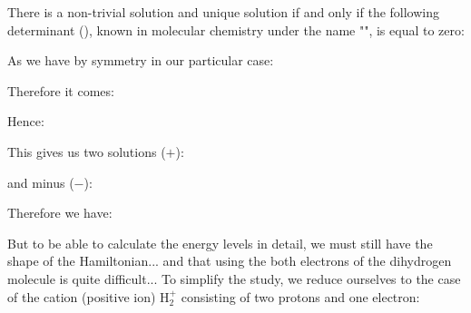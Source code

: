 	There is a non-trivial solution and unique solution if and only if the following determinant (), known in molecular chemistry under the name "", is equal to zero:
	
	As we have by symmetry in our particular case:
	
	Therefore it comes:
	
	Hence:
	
	This gives us two solutions ($+$):
	
	and minus ($-$):
	
	Therefore we have:	
	
	But to be able to calculate the energy levels in detail, we must still have the shape of the Hamiltonian... and that using the both electrons of the dihydrogen molecule is quite difficult... To simplify the study, we reduce ourselves to the case of the cation (positive ion) $\mathrm{H}_2^{+}$ consisting of two protons and one electron:
